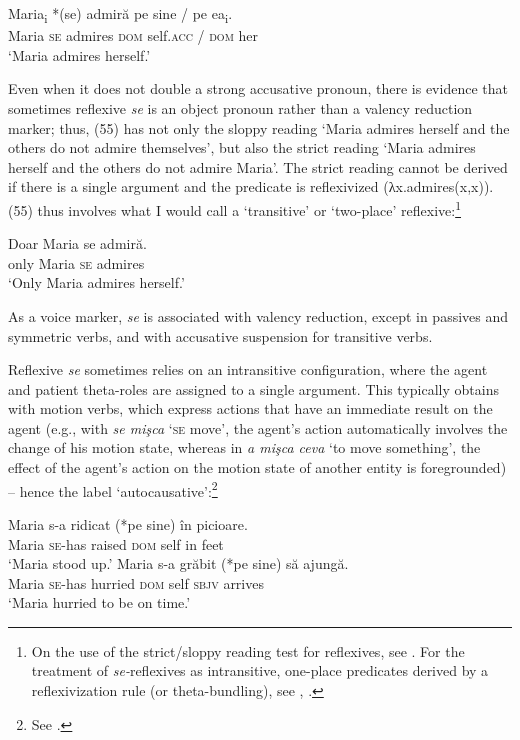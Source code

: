 \documentclass[output=paper]{langsci/langscibook}
\begin{document}
\ea%
    \label{ex:giurgea:54}
    \gll Maria\textsubscript{i} *(se) admiră  pe    sine        / pe    ea\textsubscript{i}.\\
         Maria     \textsc{se} admires \textsc{dom} self.\textsc{acc} /  \textsc{dom} her\\
    \glt ‘Maria admires herself.’
    \z

Even when it does not double a strong accusative pronoun, there is evidence that sometimes reflexive \textit{se} is an object pronoun rather than a valency reduction marker; thus, (55) has not only the sloppy reading ‘Maria admires herself and the others do not admire themselves’, but also the strict reading ‘Maria admires herself and the others do not admire Maria’. The strict reading cannot be derived if there is a single argument and the predicate is reflexivized (λx.admires(x,x)). (55) thus involves what I would call a ‘transitive' or ‘two-place' reflexive:\footnote{On the use of the strict\slash sloppy reading test for reflexives, see \citet{Sells1987,Labelle2008}. For the treatment of \textit{se-}reflexives as intransitive, one-place predicates derived by a reflexivization rule (or theta-bundling), see \citet{Reinhart1996}, \citet{Labelle2008}.}   

\ea%
    \label{ex:giurgea:55}
    \gll Doar  Maria se admiră.       \\
         only   Maria \textsc{se} admires          \\
    \glt ‘Only Maria admires herself.’
    \z

As a voice marker, \textit{se} is associated with valency reduction, except in passives and symmetric verbs, and with accusative suspension for transitive verbs.

Reflexive \textit{se} sometimes relies on an intransitive configuration, where the agent and patient theta-roles are assigned to a single argument. This typically obtains with motion verbs, which express actions that have an immediate result on the agent (e.g., with \textit{se mişca} ‘\textsc{se} move’, the agent’s action automatically involves the change of his motion state, whereas in \textit{a mişca ceva} ‘to move something’, the effect of the agent’s action on the motion state of another entity is foregrounded) – hence the label ‘autocausative':\footnote{See \citet{Geniušienė1987}.} 

\ea%
    \label{ex:giurgea:56}
    \ea
    \gll Maria s-a      ridicat (*pe     sine) în picioare.\\
          Maria \textsc{se-}has raised     \textsc{dom} self   in feet\\
    \glt ‘Maria stood up.’
    \ex
    \gll Maria s-a        grăbit   (*pe     sine)   să     ajungă.\\
          Maria \textsc{se-}has  hurried    \textsc{dom}  self    \textsc{sbjv} arrives \\
    \glt ‘Maria hurried to be on time.’ 
\z
\z
\end{document}
